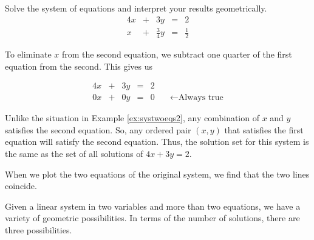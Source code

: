 \documentclass{ximera}
\begin{document}
\begin{example}\label{ex:systwoeqs3infmany} Solve the system of equations and interpret your results geometrically.
$$\begin{array}{ccccc}
      4x & +&3y&= &2 \\
	 x& +&\frac{3}{4}y&=&\frac{1}{2}
    \end{array}$$

\begin{explanation}
To eliminate $x$ from the second equation, we subtract one quarter of the first equation from the second.  This gives us

$$\begin{array}{cccccc}
      4x & +&3y&= &2& \\
	 0x& +&0y&=&0&\quad\leftarrow\mbox{Always true}
    \end{array}$$
    
Unlike the situation in Example \ref{ex:systwoeqs2}, any combination of $x$ and $y$ satisfies the second equation.  So, any ordered pair $(x, y)$ that satisfies the first equation will satisfy the second equation.  Thus, the solution set for this system is the same as the set of all solutions of $4x+3y=2$.  

When we plot the two equations of the original system, we find that the two lines coincide.


    \begin{center}
\end{center}
\end{explanation}
\end{example}

Given a linear system in two variables and more than two equations, we have a variety of geometric possibilities.  In terms of the number of solutions, there are three possibilities. 
\end{document}
